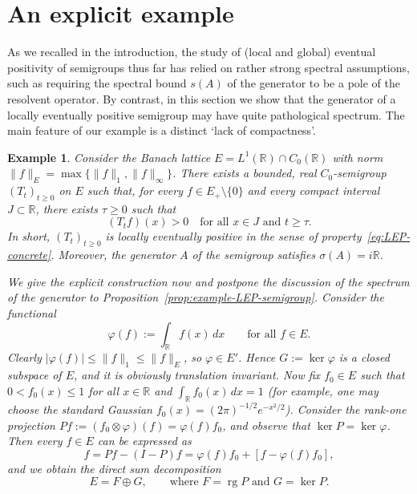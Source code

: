 \documentclass[sn-mathphys]{sn-jnl}%
\theoremstyle{thmstyleone}
\theoremstyle{thmstylethree}
\newtheorem{example}[theorem]{Example}
\DeclareMathOperator{\rg}{rg}
\newcommand{\RR}{\mathbb{R}}
\begin{document}
\section{An explicit example}\label{sec:2}
As we recalled in the introduction, the study of (local and global) eventual positivity of semigroups thus far has relied on rather strong spectral assumptions, such as requiring the spectral bound $s(A)$ of the generator to be a pole of the resolvent operator. By contrast, in this section we show that the generator of a locally eventually positive semigroup may have quite pathological spectrum. The main feature of our example is a distinct `lack of compactness'.

\begin{example}
	\label{exam:LEP-semigroup}
	Consider the Banach lattice $E = L^1(\RR) \cap C_0(\RR)$ with norm $\|f\|_E = \max\{\|f\|_1, \|f\|_\infty\}$. There exists a bounded, real $C_0$-semigroup $(T_t)_{t\ge 0}$ on $E$ such that, for every $f\in E_+\setminus\{0\}$ and every compact interval $J\subset\RR$, there exists $\tau\ge 0$ such that
	\begin{equation*}
		(T_t f)(x)>0 \quad\text{for all } x\in J\text{ and } t\ge\tau.
	\end{equation*}
	In short, $(T_t)_{t\ge 0}$ is locally eventually positive in the sense of property~\eqref{eq:LEP-concrete}. Moreover, the generator $A$ of the semigroup satisfies $\sigma(A)=i\RR$.
	
	We give the explicit construction now and postpone the discussion of the spectrum of the generator to Proposition~\ref{prop:example-LEP-semigroup}. Consider the functional
	\begin{equation*}
		\varphi(f) := \int_\RR f(x) \,dx \qquad \text{for all } f \in E.
	\end{equation*}
	Clearly $\lvert\varphi(f)\rvert \le \|f\|_1 \le \|f\|_E$, so $\varphi \in E'$. Hence $G:=\ker\varphi$ is a closed subspace of $E$, and it is obviously translation invariant. Now fix $f_0 \in E$ such that $0<f_0(x) \le 1$ for all $x \in \RR$ and $\int_\RR f_0(x) \,dx = 1$ (for example, one may choose the standard Gaussian $f_0(x)=(2\pi)^{-1/2}e^{-x^2/2}$). Consider the rank-one projection $Pf := (f_0 \otimes\varphi)(f) = \varphi(f)f_0$, and observe that $\ker P =\ker\varphi$. Then every $f \in E$ can be expressed as
	\begin{equation*}
		f = Pf - (I-P)f = \varphi(f)f_0 + [f-\varphi(f)f_0],
	\end{equation*}
	and we obtain the direct sum decomposition
	\begin{equation*}
		E = F\oplus G,\qquad \text{where }F=\rg P\text{ and }G=\ker P.
	\end{equation*}
	

\end{example}
\end{document}
